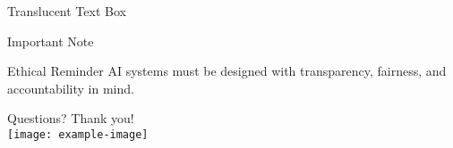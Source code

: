 \documentclass{beamer}
\begin{document}
\begin{frame}{Translucent Text Box}
  \begin{center}
  \end{center}
\end{frame}


\begin{frame}{Important Note}
  \begin{block}{Ethical Reminder}
    AI systems must be designed with transparency, fairness, and accountability in mind.
  \end{block}
\end{frame}

\begin{frame}{Questions?}
  \centering
  Thank you! \\
  \vspace{0.5cm}
  \texttt{[image: example-image]} %
\end{frame}
\end{document}
